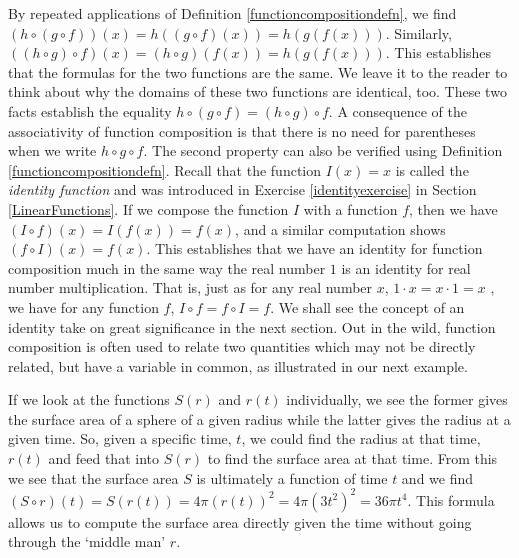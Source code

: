 \medskip

By repeated applications of Definition \ref{functioncompositiondefn}, we find  $(h \circ (g \circ f))(x) = h((g \circ f)(x)) = h(g(f(x)))$.  Similarly, $((h \circ g) \circ f)(x) = (h \circ g)(f(x)) = h(g(f(x)))$.  This establishes that the formulas for the two functions are the same.  We leave it to the reader to think about why the domains of these two functions are identical, too.  These two facts establish the equality $h \circ (g \circ f) = (h \circ g) \circ f$.  A consequence of the associativity of function composition is that there is no need for parentheses when we write $h \circ g \circ f$. The second property can also be verified using Definition \ref{functioncompositiondefn}.  Recall that the function $I(x) = x$ is called the  \textit{identity function} and was introduced in Exercise  \ref{identityexercise} in Section \ref{LinearFunctions}.  If we compose the function $I$ with a function $f$, then we have $(I \circ f)(x) = I(f(x)) = f(x)$, and a similar computation shows $(f\circ I)(x) = f(x)$. This establishes that we have an identity for function composition much in the same way the real number $1$ is an identity for real number multiplication. That is, just as for any real number $x$, $1 \cdot x = x \cdot 1 = x$ , we have for any function $f$, $ I \circ f = f \circ I =f$.  We shall see the concept of an identity take on great significance in the next section.  Out in the wild, function composition is often used to relate two quantities which may not be directly related, but have a variable in common, as illustrated in our next example.

\medskip

{If we look at the functions $S(r)$ and $r(t)$ individually, we see the former gives the surface area of a sphere of a given radius while the latter gives the radius at a given time.    So, given a specific time, $t$, we could find the radius at that time, $r(t)$ and feed that into $S(r)$ to find the surface area at that time.  From this we see that the surface area $S$ is ultimately a function of time $t$ and we find $(S \circ r)(t) = S(r(t)) = 4 \pi (r(t))^2 = 4 \pi \left(3t^2\right)^2 = 36 \pi t^{4}$.  This formula allows us to compute the surface area directly given the time without going through the `middle man' $r$. }

